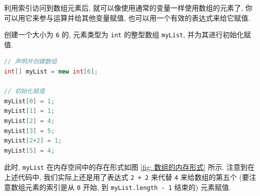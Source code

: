 \documentclass[10pt,UTF8]{book} %
\begin{document}
利用索引访问到数组元素后, 就可以像使用通常的变量一样使用数组的元素了,
你可以用它来参与运算并给其他变量赋值, 也可以用一个有效的表达式来给它赋值.
\begin{example}
    创建一个大小为 \lstinline|6| 的, 元素类型为 \lstinline|int|
    的整型数组 \lstinline|myList|, 并为其进行初始化赋值.
\begin{lstlisting}[language=Java]
// 声明并创建数组
int[] myList = new int[6];

// 初始化赋值
myList[0] = 1;
myList[1] = 1;
myList[2] = 4;
myList[3] = 5;
myList[2+2] = 1;
myList[5] = 4;
\end{lstlisting}
此时, \lstinline|myList| 在内存空间中的存在形式如图 \ref{fig: 数组的内存形式} 所示.
注意到在上述代码中, 我们实际上还是用了表达式 \lstinline|2 + 2| 来代替 \lstinline|4|
来给数组的第五个 (要注意数组元素的索引是从 \lstinline|0| 开始, 到
\lstinline|myList.length - 1| 结束的) 元素赋值.
\end{example}
\end{document}
